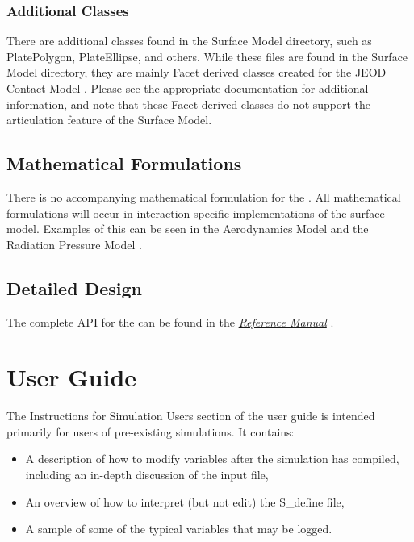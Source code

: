 \subsection{Additional Classes}

There are additional classes found in the Surface Model directory, such as PlatePolygon, PlateEllipse, and others.
While these files are found in the Surface Model directory, they are mainly Facet derived classes
created for the JEOD Contact Model \cite{dynenv:CONTACT}. Please see the appropriate  documentation for additional
information, and note that these Facet derived classes do not support the articulation feature of the
Surface Model.

\section{Mathematical Formulations}

There is no accompanying mathematical formulation for the \ModelDesc.
All mathematical formulations will occur in interaction specific
implementations of the surface model. Examples of this can be seen in
the Aerodynamics Model \cite{dynenv:AERODYNAMICS} and the Radiation Pressure
Model \cite{dynenv:RADIATIONPRESSURE}.

\section{Detailed Design}

The complete API for the \ModelDesc can be found
in the  \href{file:refman.pdf} {\em Reference Manual}
\cite{surfacemodelbib:ReferenceManual}.

\clearpage
\boilerplateinventory

\chapter{User Guide}\label{ch:user}
The Instructions for Simulation Users section of the user guide is intended primarily for users of pre-existing simulations.
It contains:
\begin{itemize}
\item A description of how to modify \ModelDesc variables after the simulation
has compiled, including an in-depth discussion of the input file,
\item An overview of how to interpret (but not edit) the S\_define file,
\item A sample of some of the typical variables that may be logged.
\end{itemize}


